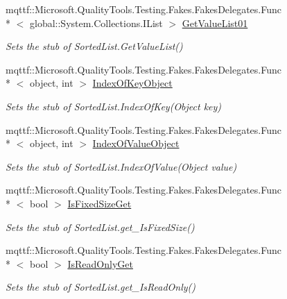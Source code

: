\begin{DoxyCompactItemize}
mqttf\-::\-Microsoft.\-Quality\-Tools.\-Testing.\-Fakes.\-Fakes\-Delegates.\-Func\\*
$<$ global\-::\-System.\-Collections.\-I\-List $>$ \hyperlink{class_system_1_1_collections_1_1_fakes_1_1_stub_sorted_list_a084d696bff9ab14c14689c59024c2f50}{Get\-Value\-List01}
\begin{DoxyCompactList}\small\item\em Sets the stub of Sorted\-List.\-Get\-Value\-List()\end{DoxyCompactList}\item 
mqttf\-::\-Microsoft.\-Quality\-Tools.\-Testing.\-Fakes.\-Fakes\-Delegates.\-Func\\*
$<$ object, int $>$ \hyperlink{class_system_1_1_collections_1_1_fakes_1_1_stub_sorted_list_a353d4f0bc8ced5d4ef27c3d3b7e5b030}{Index\-Of\-Key\-Object}
\begin{DoxyCompactList}\small\item\em Sets the stub of Sorted\-List.\-Index\-Of\-Key(\-Object key)\end{DoxyCompactList}\item 
mqttf\-::\-Microsoft.\-Quality\-Tools.\-Testing.\-Fakes.\-Fakes\-Delegates.\-Func\\*
$<$ object, int $>$ \hyperlink{class_system_1_1_collections_1_1_fakes_1_1_stub_sorted_list_ab8c5b549f79e76640161cb242cdfd30f}{Index\-Of\-Value\-Object}
\begin{DoxyCompactList}\small\item\em Sets the stub of Sorted\-List.\-Index\-Of\-Value(\-Object value)\end{DoxyCompactList}\item 
mqttf\-::\-Microsoft.\-Quality\-Tools.\-Testing.\-Fakes.\-Fakes\-Delegates.\-Func\\*
$<$ bool $>$ \hyperlink{class_system_1_1_collections_1_1_fakes_1_1_stub_sorted_list_aec4a1c5a6fb735c6d266caa79d82d8cc}{Is\-Fixed\-Size\-Get}
\begin{DoxyCompactList}\small\item\em Sets the stub of Sorted\-List.\-get\-\_\-\-Is\-Fixed\-Size()\end{DoxyCompactList}\item 
mqttf\-::\-Microsoft.\-Quality\-Tools.\-Testing.\-Fakes.\-Fakes\-Delegates.\-Func\\*
$<$ bool $>$ \hyperlink{class_system_1_1_collections_1_1_fakes_1_1_stub_sorted_list_aa1f72a4053c2b24846222b607f80906f}{Is\-Read\-Only\-Get}
\begin{DoxyCompactList}\small\item\em Sets the stub of Sorted\-List.\-get\-\_\-\-Is\-Read\-Only()\end{DoxyCompactList}\item 

\end{DoxyCompactItemize}
